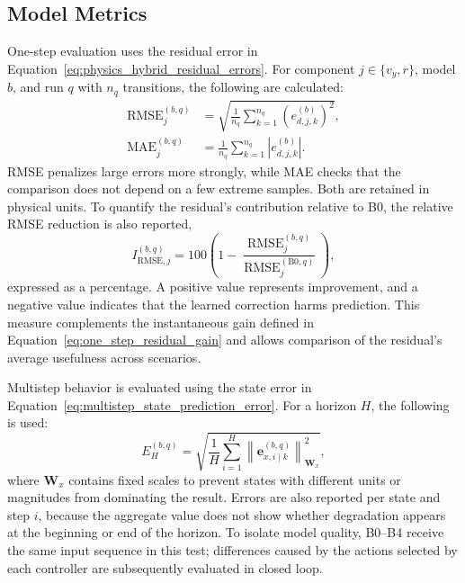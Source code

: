 \documentclass[12pt,a4paper]{report}
\begin{document}
\subsection{Model Metrics}
\label{sec:metricas_modelo}

One-step evaluation uses the residual error in Equation~\eqref{eq:physics_hybrid_residual_errors}. For component $j\in\{v_y,r\}$, model $b$, and run $q$ with $n_q$ transitions, the following are calculated:
\begin{align}
    \operatorname{RMSE}^{(b,q)}_j
    &=
    \sqrt{
        \frac{1}{n_q}
        \sum_{k=1}^{n_q}
        \left(e^{(b)}_{d,j,k}\right)^2
    },
    \label{eq:evaluation_rmse}\\
    \operatorname{MAE}^{(b,q)}_j
    &=
    \frac{1}{n_q}
    \sum_{k=1}^{n_q}
    \left|e^{(b)}_{d,j,k}\right|.
    \label{eq:evaluation_mae}
\end{align}
RMSE penalizes large errors more strongly, while MAE checks that the comparison does not depend on a few extreme samples. Both are retained in physical units. To quantify the residual's contribution relative to B0, the relative RMSE reduction is also reported,
\begin{equation}
    I^{(b,q)}_{\mathrm{RMSE},j}
    =
    100\left(
        1-
        \frac{\operatorname{RMSE}^{(b,q)}_j}
             {\operatorname{RMSE}^{(\mathrm{B0},q)}_j}
    \right),
    \label{eq:relative_rmse_improvement}
\end{equation}
expressed as a percentage. A positive value represents improvement, and a negative value indicates that the learned correction harms prediction. This measure complements the instantaneous gain defined in Equation~\eqref{eq:one_step_residual_gain} and allows comparison of the residual's average usefulness across scenarios.

Multistep behavior is evaluated using the state error in Equation~\eqref{eq:multistep_state_prediction_error}. For a horizon $H$, the following is used:
\begin{equation}
    E^{(b,q)}_{H}
    =
    \sqrt{
        \frac{1}{H}
        \sum_{i=1}^{H}
        \left\|
            \mathbf e^{(b,q)}_{x,i\mid k}
        \right\|_{\mathbf W_x}^{2}
    },
    \label{eq:weighted_multistep_error}
\end{equation}
where $\mathbf W_x$ contains fixed scales to prevent states with different units or magnitudes from dominating the result. Errors are also reported per state and step $i$, because the aggregate value does not show whether degradation appears at the beginning or end of the horizon. To isolate model quality, B0--B4 receive the same input sequence in this test; differences caused by the actions selected by each controller are subsequently evaluated in closed loop.
\end{document}
